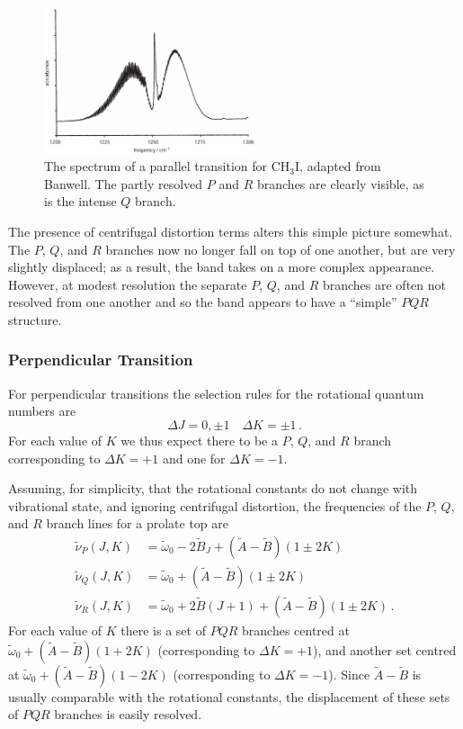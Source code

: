 \documentclass{article}
\theoremstyle{plain}\theoremheaderfont{\normalfont\itshape}\theorembodyfont{\rmfamily}\theoremseparator{.}\newtheorem*{rem}{Remark}\newtheorem*{ex}{Example}\newtheorem*{proof}{Proof}\newtheorem*{altp}{Alternative proof}
\theoremstyle{plain}\theoremheaderfont{\normalfont\bfseries}\theorembodyfont{\rmfamily}\theoremseparator{.}\newtheorem{thm}{Theorem}[section]\newtheorem{lem}[thm]{Lemma}\newtheorem{prop}[thm]{Proposition}\newtheorem*{cor}{Corollary}\newtheorem{defn}[thm]{Definition}\newtheorem{clm}[thm]{Claim}\newtheorem{clminproof}{Claim}\newtheorem{pos}{Postulate}[section]
\theoremstyle{break}\theoremheaderfont{\normalfont\itshape}\theorembodyfont{\rmfamily}\theoremseparator{.\medskip}\newtheorem*{proofskip}{Proof}\newtheorem*{exs}{Examples}\newtheorem*{rems}{Remarks}
\theoremstyle{break}\theoremheaderfont{\normalfont\bfseries}\theorembodyfont{\rmfamily}\theoremseparator{.\medskip}\newtheorem{lemskip}[thm]{Lemma}\newtheorem{defnskip}[thm]{Definition}\newtheorem{propskip}[thm]{Proposition}\newtheorem{thmskip}[thm]{Theorem}
\numberwithin{equation}{section}
\begin{document}
    \begin{figure}
        \centering
        \includegraphics[width=0.55\textwidth]{CH3I_parallel.png}
        \caption{The spectrum of a parallel transition for \(\mathrm{CH_3I}\), adapted from Banwell. The partly resolved \(P\) and \(R\) branches are clearly visible, as is the intense \(Q\) branch.}
    \end{figure}

    The presence of centrifugal distortion terms alters this simple picture somewhat. The \(P\), \(Q\), and \(R\) branches now no longer fall on top of one another, but are very slightly displaced; as a result, the band takes on a more complex appearance. However, at modest resolution the separate \(P\), \(Q\), and \(R\) branches are often not resolved from one another and so the band
    appears to have a ``simple'' \(PQR\) structure.

    \subsubsection*{Perpendicular Transition}
    For perpendicular transitions the selection rules for the rotational quantum numbers are
    \begin{equation}
        \Delta J=0,\pm 1\quad \Delta K=\pm 1\,.
    \end{equation}
    For each value of \(K\) we thus expect there to be a \(P\), \(Q\), and \(R\) branch corresponding to \(\Delta K=+1\) and one for \(\Delta K=-1\).

    Assuming, for simplicity, that the rotational constants do not change with vibrational state, and ignoring centrifugal distortion, the frequencies of the \(P\), \(Q\), and \(R\) branch lines for a prolate top are
    \begin{align}
        \tilde{\nu}_P(J,K)&=\tilde{\omega}_0-2\tilde{B}_J+(\tilde{A}-\tilde{B})(1\pm 2K)\\
        \tilde{\nu}_Q(J,K)&=\tilde{\omega}_0+(\tilde{A}-\tilde{B})(1\pm 2K)\\
        \tilde{\nu}_R(J,K)&=\tilde{\omega}_0+2\tilde{B}(J+1)+(\tilde{A}-\tilde{B})(1\pm 2K)\,.
    \end{align}
    For each value of \(K\) there is a set of \(PQR\) branches centred at \(\tilde{\omega}_0+(\tilde{A}-\tilde{B})(1+ 2K)\) (corresponding to \(\Delta K=+1\)), and another set centred at \(\tilde{\omega}_0+(\tilde{A}-\tilde{B})(1- 2K)\) (corresponding to \(\Delta K=-1\)). Since \(\tilde{A}-\tilde{B}\) is usually comparable with the rotational constants, the displacement of these sets of \(PQR\) branches is easily resolved.
\end{document}

